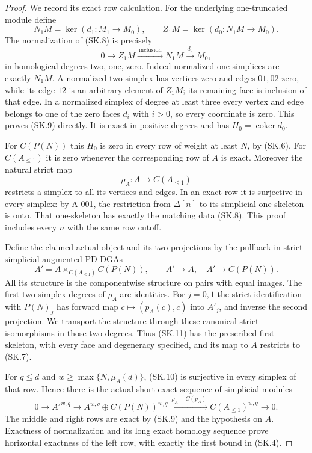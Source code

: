 \begin{proof}
We record its exact row calculation. For the underlying
one-truncated module define
\[
 N_1M=\ker(d_1:M_1\to M_0),\qquad
 Z_1M=\ker(d_0:N_1M\to M_0).
\]
The normalization of (SK.8) is precisely
\[
                 0\longrightarrow Z_1M
                 \xrightarrow{\ \mathrm{inclusion}\ }N_1M
                 \xrightarrow{\ d_0\ }M_0,
 \tag{SK.9}
\]
in homological degrees two, one, zero.
Indeed normalized one-simplices are exactly $N_1M$.
A normalized two-simplex has vertices zero and edges $01,02$
zero, while its edge $12$ is an arbitrary element of $Z_1M$;
its remaining face is inclusion of that edge. In a normalized
simplex of degree at least three every vertex and edge belongs
to one of the zero faces $d_i$ with $i>0$, so every coordinate
is zero. This proves (SK.9) directly.
It is exact in positive degrees and has $H_0=\operatorname{coker}d_0$.

For $C(P(N))$ this $H_0$ is zero in every row of weight at least
$N$, by (SK.6). For $C(A_{\leq1})$ it is zero whenever the
corresponding row of $A$ is exact. Moreover the natural strict map
\[
                        \rho_A:A\longrightarrow C(A_{\leq1})
 \tag{SK.10}
\]
restricts a simplex to all its vertices and edges. In an exact
row it is surjective in every simplex: by A-001, the restriction
from $\Delta[n]$ to its simplicial one-skeleton is onto.
That one-skeleton has exactly the matching data (SK.8).
This proof includes every $n$ with the same row cutoff.

Define the claimed actual object and its two projections by the
pullback in strict simplicial augmented PD DGAs
\[
 A'=A\mathop{\times}_{C(A_{\leq1})} C(P(N)),
 \qquad A'\longrightarrow A,\quad A'\longrightarrow C(P(N)).
 \tag{SK.11}
\]
All its structure is the componentwise structure on pairs with
equal images. The first two simplex degrees of $\rho_A$ are
identities. For $j=0,1$ the strict identification with $P(N)_j$
has forward map $c\mapsto(p_A(c),c)$ into $A'_j$, and inverse
the second projection. We transport the structure through these
canonical strict isomorphisms in those two degrees. Thus (SK.11)
has the prescribed first skeleton, with every face and degeneracy
specified, and its map to $A$ restricts to (SK.7).

For $q\leq d$ and $w\geq\max\{N,\mu_A(d)\}$, (SK.10) is
surjective in every simplex of that row. Hence there is the
actual short exact sequence of simplicial modules
\[
 0\longrightarrow A'^{w,q}\longrightarrow
 A^{w,q}\oplus C(P(N))^{w,q}
 \xrightarrow{\ \rho_A-C(p_A)\ }C(A_{\leq1})^{w,q}
 \longrightarrow0.
 \tag{SK.12}
\]
The middle and right rows are exact by (SK.9) and the hypothesis
on $A$. Exactness of normalization and its long exact homology
sequence prove horizontal exactness of the left row, with exactly
the first bound in (SK.4).


\end{proof}
